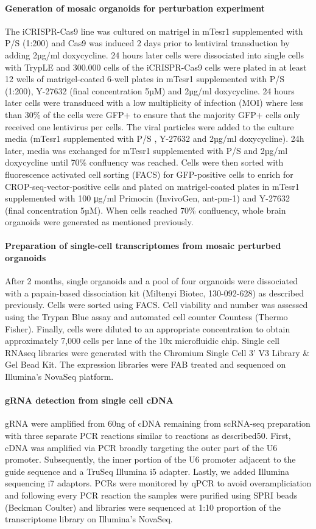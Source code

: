 \paragraph{Generation of mosaic organoids for perturbation experiment}
The iCRISPR-Cas9 line was cultured on matrigel in mTesr1 supplemented with P/S (1:200) and Cas9 was induced 2 days prior to lentiviral transduction by adding 2µg/ml doxycycline. 24 hours later cells were dissociated into single cells with TrypLE and 300.000 cells of the iCRISPR-Cas9 cells were plated in at least 12 wells of  matrigel-coated 6-well plates in mTesr1 supplemented with P/S (1:200), Y-27632 (final concentration 5µM) and 2µg/ml doxycycline. 24 hours later cells were transduced with a low multiplicity of infection (MOI) where less than 30\% of the cells were GFP+ to ensure that the majority GFP+ cells only received one lentivirus per cells. The viral particles were added to the culture media (mTesr1 supplemented with P/S , Y-27632 and 2µg/ml doxycycline). 24h later, media was exchanged for mTesr1 supplemented with P/S and 2µg/ml doxycycline until 70\% confluency was reached. Cells were then sorted with fluorescence  activated  cell sorting (FACS) for GFP-positive cells  to enrich for CROP-seq-vector-positive cells and plated on matrigel-coated plates in  mTesr1 supplemented with 100 μg/ml Primocin (InvivoGen, ant-pm-1) and Y-27632 (final concentration 5µM). When cells reached 70\% confluency, whole brain organoids were generated as mentioned previously.
 
\paragraph{Preparation of single-cell transcriptomes from mosaic perturbed organoids}
After 2 months, single organoids and a pool of four organoids were dissociated with a papain-based dissociation kit (Miltenyi Biotec, 130-092-628) as described previously. Cells were sorted using FACS. Cell viability and number was assessed using the Trypan Blue assay and automated cell counter Countess (Thermo Fisher). Finally, cells were diluted to an appropriate concentration to obtain approximately 7,000 cells per lane of the 10x microfluidic chip.  Single cell RNAseq libraries were generated with the Chromium Single Cell 3’ V3 Library \& Gel Bead Kit. The expression libraries were FAB treated and sequenced on Illumina’s NovaSeq platform.
 
\paragraph{gRNA detection from single cell cDNA}
gRNA were amplified from 60ng of cDNA remaining from scRNA-seq preparation with three separate PCR reactions similar to reactions as described50. First, cDNA was amplified via PCR broadly targeting the outer part of the U6 promoter. Subsequently, the inner portion of the U6 promoter adjacent to the guide sequence and a TruSeq Illumina i5 adapter. Lastly, we added Illumina sequencing i7 adaptors. PCRs were monitored by qPCR to avoid overampliciation and following every PCR reaction the samples were purified using SPRI beads (Beckman Coulter) and libraries were sequenced at 1:10 proportion of the transcriptome library on Illumina’s NovaSeq.
 
